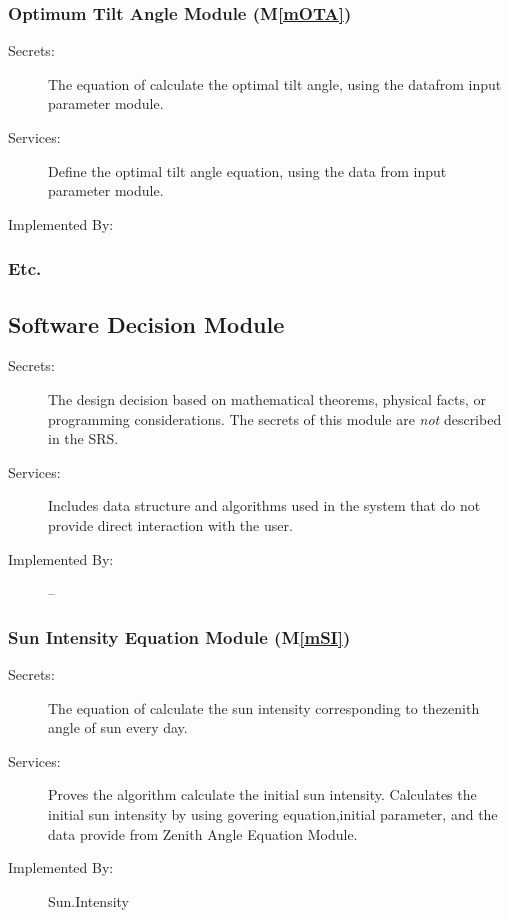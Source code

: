 \documentclass[12pt, titlepage]{article}
\newcommand{\mref}[1]{M\ref{#1}}
\begin{document}
\subsubsection{Optimum Tilt Angle Module (\mref{mOTA})}

\begin{description}
\item[Secrets:]The equation of calculate the optimal tilt angle, using the
datafrom input parameter module.
\item[Services:] Define the optimal tilt angle equation, using the data from
input
parameter module.
\item[Implemented By:] \progname
\end{description}



\subsubsection{Etc.}


\subsection{Software Decision Module}

\begin{description}
\item[Secrets:] The design decision based on mathematical theorems, physical
  facts, or programming considerations. The secrets of this module are
  \emph{not} described in the SRS.
\item[Services:] Includes data structure and algorithms used in the system that
  do not provide direct interaction with the user. 
\item[Implemented By:] --
\end{description}


\subsubsection{Sun Intensity Equation Module (\mref{mSI})}

\begin{description}
\item[Secrets:]The equation of calculate the sun intensity corresponding to
thezenith angle of sun every day.
\item[Services:] Proves the algorithm calculate the initial sun intensity.
Calculates the initial sun intensity by using govering equation,initial
parameter, and the data provide from Zenith Angle Equation Module.

\item[Implemented By:] Sun.Intensity
\end{description}
\end{document}
